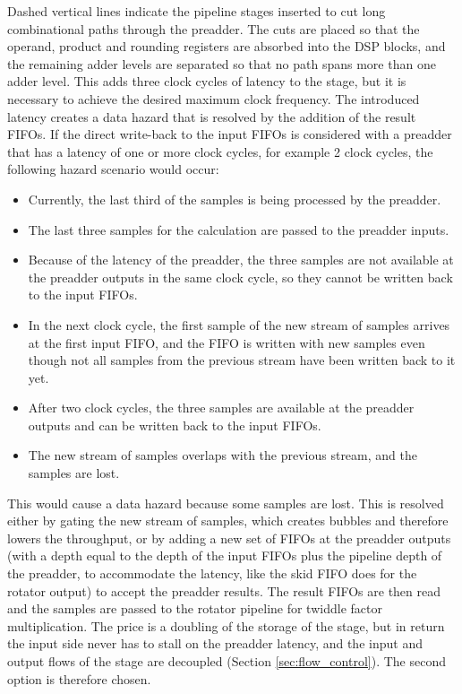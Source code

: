 \documentclass[a4paper,12pt, master]{etf}
\begin{document}
Dashed vertical lines indicate the pipeline stages inserted to cut long combinational paths through the preadder. The cuts are placed so that the operand, product and rounding registers are absorbed into the DSP blocks, and the remaining adder levels are separated so that no path spans more than one adder level. This adds three clock cycles of latency to the stage, but it is necessary to achieve the desired maximum clock frequency. The introduced latency creates a data hazard that is resolved by the addition of the result FIFOs. If the direct write-back to the input FIFOs is considered with a preadder that has a latency of one or more clock cycles, for example 2 clock cycles, the following hazard scenario would occur:
\begin{itemize}
    \item Currently, the last third of the samples is being processed by the preadder.
    \item The last three samples for the calculation are passed to the preadder inputs.
    \item Because of the latency of the preadder, the three samples are not available at the preadder outputs in the same clock cycle, so they cannot be written back to the input FIFOs.
    \item In the next clock cycle, the first sample of the new stream of samples arrives at the first input FIFO, and the FIFO is written with new samples even though not all samples from the previous stream have been written back to it yet.
    \item After two clock cycles, the three samples are available at the preadder outputs and can be written back to the input FIFOs.
    \item The new stream of samples overlaps with the previous stream, and the samples are lost.
\end{itemize}
This would cause a data hazard because some samples are lost. This is resolved either by gating the new stream of samples, which creates bubbles and therefore lowers the throughput, or by adding a new set of FIFOs at the preadder outputs (with a depth equal to the depth of the input FIFOs plus the pipeline depth of the preadder, to accommodate the latency, like the skid FIFO does for the rotator output) to accept the preadder results. The result FIFOs are then read and the samples are passed to the rotator pipeline for twiddle factor multiplication. The price is a doubling of the storage of the stage, but in return the input side never has to stall on the preadder latency, and the input and output flows of the stage are decoupled (Section \ref{sec:flow_control}). The second option is therefore chosen.
\end{document}
